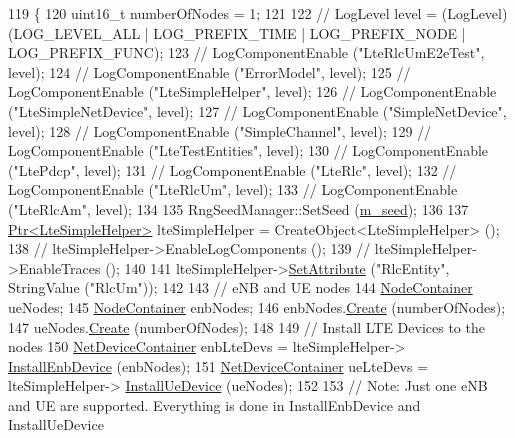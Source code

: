 \begin{DoxyCode}
119 \{
120   uint16\_t numberOfNodes = 1;
121 
122   \textcolor{comment}{// LogLevel level = (LogLevel) (LOG\_LEVEL\_ALL | LOG\_PREFIX\_TIME | LOG\_PREFIX\_NODE | LOG\_PREFIX\_FUNC);}
123   \textcolor{comment}{// LogComponentEnable ("LteRlcUmE2eTest", level);}
124   \textcolor{comment}{// LogComponentEnable ("ErrorModel", level);}
125   \textcolor{comment}{// LogComponentEnable ("LteSimpleHelper", level);}
126   \textcolor{comment}{// LogComponentEnable ("LteSimpleNetDevice", level);}
127   \textcolor{comment}{// LogComponentEnable ("SimpleNetDevice", level);}
128   \textcolor{comment}{// LogComponentEnable ("SimpleChannel", level);}
129   \textcolor{comment}{// LogComponentEnable ("LteTestEntities", level);}
130   \textcolor{comment}{// LogComponentEnable ("LtePdcp", level);}
131   \textcolor{comment}{// LogComponentEnable ("LteRlc", level);}
132   \textcolor{comment}{// LogComponentEnable ("LteRlcUm", level);}
133   \textcolor{comment}{// LogComponentEnable ("LteRlcAm", level);}
134 
135   RngSeedManager::SetSeed (\hyperlink{classLteRlcUmE2eTestCase_a4efdc34bf54ce1409c1176bdb5ee5d08}{m\_seed});
136 
137   \hyperlink{classns3_1_1Ptr}{Ptr<LteSimpleHelper>} lteSimpleHelper = CreateObject<LteSimpleHelper> ();
138   \textcolor{comment}{// lteSimpleHelper->EnableLogComponents ();}
139   \textcolor{comment}{// lteSimpleHelper->EnableTraces ();}
140 
141   lteSimpleHelper->\hyperlink{classns3_1_1ObjectBase_ac60245d3ea4123bbc9b1d391f1f6592f}{SetAttribute} (\textcolor{stringliteral}{"RlcEntity"}, StringValue (\textcolor{stringliteral}{"RlcUm"}));
142 
143   \textcolor{comment}{// eNB and UE nodes}
144   \hyperlink{classns3_1_1NodeContainer}{NodeContainer} ueNodes;
145   \hyperlink{classns3_1_1NodeContainer}{NodeContainer} enbNodes;
146   enbNodes.\hyperlink{classns3_1_1NodeContainer_a787f059e2813e8b951cc6914d11dfe69}{Create} (numberOfNodes);
147   ueNodes.\hyperlink{classns3_1_1NodeContainer_a787f059e2813e8b951cc6914d11dfe69}{Create} (numberOfNodes);
148 
149   \textcolor{comment}{// Install LTE Devices to the nodes}
150   \hyperlink{classns3_1_1NetDeviceContainer}{NetDeviceContainer} enbLteDevs = lteSimpleHelper->
      \hyperlink{classns3_1_1LteSimpleHelper_a406e71dd8dcda8fa2f9a9fc31ff6494a}{InstallEnbDevice} (enbNodes);
151   \hyperlink{classns3_1_1NetDeviceContainer}{NetDeviceContainer} ueLteDevs = lteSimpleHelper->
      \hyperlink{classns3_1_1LteSimpleHelper_aa575a9480b50754a2a01e038ca5c5f27}{InstallUeDevice} (ueNodes);
152 
153   \textcolor{comment}{// Note: Just one eNB and UE are supported. Everything is done in InstallEnbDevice and InstallUeDevice}

\end{DoxyCode}

